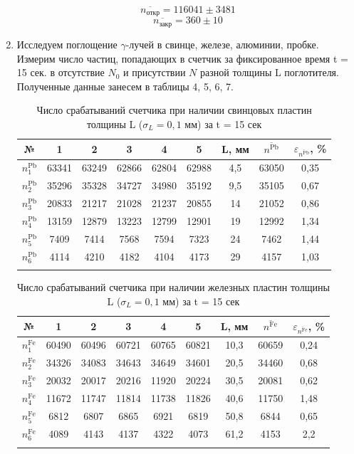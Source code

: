 \documentclass[a4paper, 12pt]{article}%
\begin{document}
\begin{enumerate}
	$$ \overline{n_{\text{откр}}} = 116041 \pm 3481$$
	$$ \overline{n_{\text{закр}}} = 360 \pm 10$$
				
	\item Исследуем поглощение $\gamma$-лучей в свинце, железе, алюминии, пробке.
	Измерим число частиц, попадающих в счетчик за фиксированное время t = 15 сек. в отсутствие $N_0$ и присутствии $N$ разной толщины L поглотителя. Полученные данные занесем в таблицы 4, 5, 6, 7.
	
	
	\begin{longtable}{|c|c|c|c|c|c|c|c|c|}
		\hline
		№ & 1 & 2 & 3 & 4 & 5 & L, мм &  $\overline{n^{\text{Pb}}}$ & $\varepsilon_{\overline{n^{\text{Pb}}}}$, \% \\ \hline
		$n_{1}^{\text{Pb}}$ & 63341 & 63249 & 62866 & 62804 & 62988 & 4,5 & 63050 & 0,35\\ \hline
		$n_{2}^{\text{Pb}}$ & 35296 & 35328 & 34727 & 34980 & 35192 & 9,5 & 35105 & 0,67\\ \hline
		$n_{3}^{\text{Pb}}$ & 20833 & 21217 & 21028 & 21237 & 20855 & 14 & 21052 & 0,86 \\ \hline
		$n_{4}^{\text{Pb}}$ & 13159 & 12879 & 13223 & 12799 & 12901 & 19 & 12992 & 1,34\\ \hline
		$n_{5}^{\text{Pb}}$ & 7409 & 7414 & 7568 & 7594 & 7323 & 24 & 7462 & 1,44\\
	    \hline
		$n_{6}^{\text{Pb}}$ & 4114 & 4210 & 4182 & 4104 & 4173 & 29 & 4157 & 1,03\\
		\hline
		
		\caption{Число срабатываний счетчика при наличии свинцовых пластин толщины L ($\sigma_L = 0,1$ мм) за t = 15 сек}
	\end{longtable}
	
	
	\begin{longtable}{|c|c|c|c|c|c|c|c|c|}
		\hline
		№ & 1 & 2 & 3 & 4 & 5 & L, мм & $\overline{n^{\text{Fe}}}$& $\varepsilon_{\overline{n^{\text{Fe}}}}$, \% \\ \hline
		$n_{1}^{\text{Fe}}$ & 60490 & 60496 & 60721 & 60765 & 60821 & 10,3 & 60659 & 0,24\\ \hline
		$n_{2}^{\text{Fe}}$ & 34326 & 34083 & 34643 & 34649 & 34601 & 20,5 & 34460 & 0,68 \\ \hline
		$n_{3}^{\text{Fe}}$ & 20032 & 20017 & 20216 & 11920 & 20224 & 30,5 & 20081 & 0,62\\ \hline
		$n_{4}^{\text{Fe}}$ & 11672 & 11747 & 11814 & 11738 & 11826 & 40,6 & 11750 & 1,48\\ \hline
		$n_{5}^{\text{Fe}}$ & 6812 & 6807 & 6865 & 6921 & 6819 & 50,8 & 6844 & 0,65\\ 
		\hline
		$n_{6}^{\text{Fe}}$ & 4089 & 4143 & 4137 & 4322 & 4073 & 61,2 & 4153 & 2,2\\
		\hline
		\caption{Число срабатываний счетчика при наличии железных  пластин толщины L ($\sigma_L = 0,1$ мм) за t = 15 сек}
	\end{longtable}


\end{enumerate}
\end{document}
